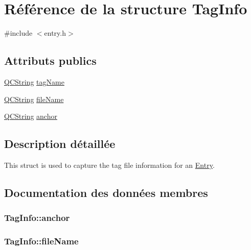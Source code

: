 \hypertarget{struct_tag_info}{}\section{Référence de la structure Tag\+Info}
\label{struct_tag_info}


{\ttfamily \#include $<$entry.\+h$>$}

\subsection*{Attributs publics}
\begin{DoxyCompactItemize}
\item 
\hyperlink{class_q_c_string}{Q\+C\+String} \hyperlink{struct_tag_info_a8f42f0aff3cb6df860f7b5ba27f6cd2f}{tag\+Name}
\item 
\hyperlink{class_q_c_string}{Q\+C\+String} \hyperlink{struct_tag_info_a7c046d5ccf0095527213dabbbf0949f9}{file\+Name}
\item 
\hyperlink{class_q_c_string}{Q\+C\+String} \hyperlink{struct_tag_info_a1cc95c706df919ed12443c7574e12aa0}{anchor}
\end{DoxyCompactItemize}


\subsection{Description détaillée}
This struct is used to capture the tag file information for an \hyperlink{class_entry}{Entry}. 

\subsection{Documentation des données membres}
\hypertarget{struct_tag_info_a1cc95c706df919ed12443c7574e12aa0}{}
\subsubsection[{anchor}]{ Tag\+Info\+::anchor}\label{struct_tag_info_a1cc95c706df919ed12443c7574e12aa0}
\hypertarget{struct_tag_info_a7c046d5ccf0095527213dabbbf0949f9}{}
\subsubsection[{file\+Name}]{ Tag\+Info\+::file\+Name}\label{struct_tag_info_a7c046d5ccf0095527213dabbbf0949f9}
\hypertarget{struct_tag_info_a8f42f0aff3cb6df860f7b5ba27f6cd2f}{}
